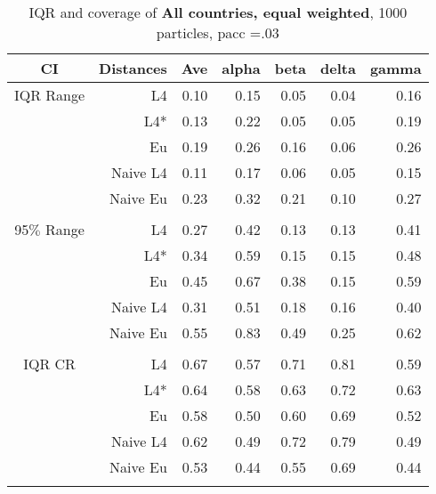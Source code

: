 \documentclass[a4paper,12pt,twoside]{book}
\begin{document}
\begin{table}[H]
\centering
\caption{IQR and coverage of \textbf{All countries, equal weighted}, 1000 particles, pacc =.03}

\begin{tabular}{crrrrrr}
  \hline
{\color{blue}CI} & Distances & Ave & alpha & beta & delta & gamma \\ 
  \hline
{\color{blue}IQR Range} & L4  &0.10 & 0.15 & 0.05 & 0.04 & 0.16 \\ 
  
&L4*  &0.13 & 0.22 & 0.05 & 0.05 & 0.19 \\ 
  
&Eu &     0.19 & 0.26 & 0.16 & 0.06 & 0.26 \\ 
 
&Naive L4& 0.11 & 0.17 & 0.06 & 0.05 & 0.15 \\ 
&Naive Eu &   0.23 & 0.32 & 0.21 & 0.10 & 0.27 \\ \\
  
    {\color{blue}95$\%$ Range} & L4  &0.27 & 0.42 & 0.13 & 0.13 & 0.41 \\ 
  
    &L4*  & 0.34 & 0.59 & 0.15 & 0.15 & 0.48 \\ 
  
&Eu &    0.45 & 0.67 & 0.38 & 0.15 & 0.59 \\ 
  
&Naive L4&     0.31 & 0.51 & 0.18 & 0.16 & 0.40 \\
 
&Naive Eu &   0.55 & 0.83 & 0.49 & 0.25 & 0.62 \\ \\
 
   \hline
   
{\color{blue} IQR CR } & L4  &0.67 & 0.57 & 0.71 & 0.81 & 0.59 \\ 
 

&L4*  &    0.64 & 0.58 & 0.63 & 0.72 & 0.63 \\ 
 
 
&Eu &    0.58 & 0.50 & 0.60 & 0.69 & 0.52 \\ 
 
  
&Naive L4& 0.62 & 0.49 & 0.72 & 0.79 & 0.49 \\ 
&Naive Eu &   0.53 & 0.44 & 0.55 & 0.69 & 0.44 \\ \\
  


\end{tabular}
\end{table}
\end{document}
